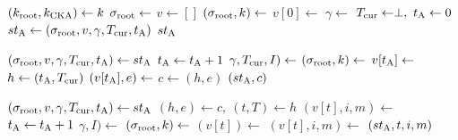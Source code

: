 \algrenewcommand\textproc{}
\algrenewcommand{}

\begin{minipage}{0.5\linewidth}
  {\fontsize{10}{12}\selectfont

  \begin{algorithmic}[1]
    \State $(k_\text{root},k_\text{CKA}) \gets k$
    \State $\sigma_\text{root} \gets$ 
    \State $v \gets []$
    \State $(\sigma_\text{root},k) \gets$ 
    \State $v[0] \gets$ 
    \State $\gamma \gets$ 
    \State $T_\text{cur} \gets \perp, \ t_\text{A} \gets 0$
    \State $st_\text{A} \gets (\sigma_\text{root},v,\gamma,T_\text{cur},t_\text{A})$
    \State \Return $st_\text{A}$
    \EndProcedure
    
    \item[]
    
    \State $(\sigma_\text{root},v,\gamma,T_\text{cur},t_\text{A}) \gets st_\text{A}$
    \State $t_\text{A} \gets t_\text{A}+1$
    \State $\gamma,T_\text{cur},I) \gets$ 
    \State $(\sigma_\text{root},k) \gets$ 
    \State $v[t_\text{A}] \gets$ 
    \EndIf
    \State $h \gets (t_\text{A},T_\text{cur})$
    \State $(v[t_\text{A}],e) \gets$ 
    \State $c \gets (h,e)$
    \State \Return $(st_\text{A},c)$
    \EndProcedure
  \end{algorithmic}
  }
\end{minipage}
\begin{minipage}{0.5\linewidth}
  {\fontsize{10}{12}\selectfont

  \begin{algorithmic}[1]
    \State $(\sigma_\text{root},v,\gamma,T_\text{cur},t_\text{A}) \gets st_\text{A}$
    \State $(h,e) \gets c, \ (t,T) \gets h$
    \State $(v[t],i,m) \gets$ 
    \State $t_\text{A} \gets t_\text{A}+1$
    \State $\gamma,I) \gets$ 
    \State $(\sigma_\text{root},k) \gets$ 
    \State $(v[t]) \gets$ 
    \State $(v[t],i,m) \gets$ 
    \EndIf
    \State \Return $(st_\text{A},t,i,m)$
    \EndProcedure
  \end{algorithmic}
  }
\end{minipage}

